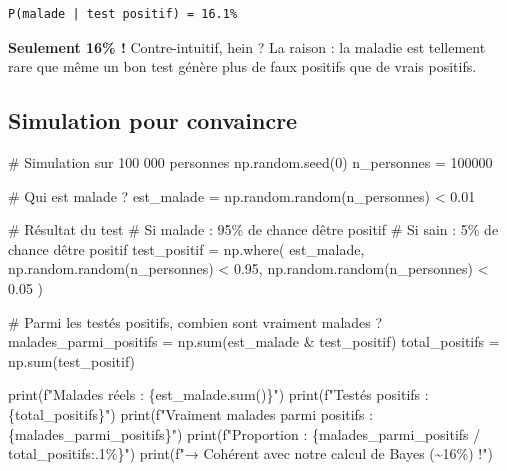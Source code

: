 \documentclass[
  french,
  11pt,
  a4paper,
]{scrbook}
\newenvironment{Shaded}{}{}
\newcommand{\BuiltInTok}[1]{\textcolor[rgb]{0.84,0.23,0.29}{#1}}
\newcommand{\CommentTok}[1]{\textcolor[rgb]{0.42,0.45,0.49}{#1}}
\newcommand{\DecValTok}[1]{\textcolor[rgb]{0.00,0.36,0.77}{#1}}
\newcommand{\FloatTok}[1]{\textcolor[rgb]{0.00,0.36,0.77}{#1}}
\newcommand{\NormalTok}[1]{\textcolor[rgb]{0.14,0.16,0.18}{#1}}
\newcommand{\OperatorTok}[1]{\textcolor[rgb]{0.14,0.16,0.18}{#1}}
\newcommand{\SpecialCharTok}[1]{\textcolor[rgb]{0.00,0.36,0.77}{#1}}
\newcommand{\SpecialStringTok}[1]{\textcolor[rgb]{0.01,0.18,0.38}{#1}}
\begin{document}
\begin{verbatim}
P(malade | test positif) = 16.1%
\end{verbatim}

\textbf{Seulement 16\% !} Contre-intuitif, hein ? La raison : la maladie
est tellement rare que même un bon test génère plus de faux positifs que
de vrais positifs.

\subsection{Simulation pour
convaincre}\label{simulation-pour-convaincre}

\begin{Shaded}
\begin{Highlighting}[]
\CommentTok{\# Simulation sur 100 000 personnes}
\NormalTok{np.random.seed(}\DecValTok{0}\NormalTok{)}
\NormalTok{n\_personnes }\OperatorTok{=} \DecValTok{100000}

\CommentTok{\# Qui est malade ?}
\NormalTok{est\_malade }\OperatorTok{=}\NormalTok{ np.random.random(n\_personnes) }\OperatorTok{\textless{}} \FloatTok{0.01}

\CommentTok{\# Résultat du test}
\CommentTok{\# Si malade : 95\% de chance d\textquotesingle{}être positif}
\CommentTok{\# Si sain   : 5\% de chance d\textquotesingle{}être positif}
\NormalTok{test\_positif }\OperatorTok{=}\NormalTok{ np.where(}
\NormalTok{    est\_malade,}
\NormalTok{    np.random.random(n\_personnes) }\OperatorTok{\textless{}} \FloatTok{0.95}\NormalTok{,}
\NormalTok{    np.random.random(n\_personnes) }\OperatorTok{\textless{}} \FloatTok{0.05}
\NormalTok{)}

\CommentTok{\# Parmi les testés positifs, combien sont vraiment malades ?}
\NormalTok{malades\_parmi\_positifs }\OperatorTok{=}\NormalTok{ np.}\BuiltInTok{sum}\NormalTok{(est\_malade }\OperatorTok{\&}\NormalTok{ test\_positif)}
\NormalTok{total\_positifs }\OperatorTok{=}\NormalTok{ np.}\BuiltInTok{sum}\NormalTok{(test\_positif)}

\BuiltInTok{print}\NormalTok{(}\SpecialStringTok{f"Malades réels           : }\SpecialCharTok{\{}\NormalTok{est\_malade}\SpecialCharTok{.}\BuiltInTok{sum}\NormalTok{()}\SpecialCharTok{\}}\SpecialStringTok{"}\NormalTok{)}
\BuiltInTok{print}\NormalTok{(}\SpecialStringTok{f"Testés positifs         : }\SpecialCharTok{\{}\NormalTok{total\_positifs}\SpecialCharTok{\}}\SpecialStringTok{"}\NormalTok{)}
\BuiltInTok{print}\NormalTok{(}\SpecialStringTok{f"Vraiment malades parmi positifs : }\SpecialCharTok{\{}\NormalTok{malades\_parmi\_positifs}\SpecialCharTok{\}}\SpecialStringTok{"}\NormalTok{)}
\BuiltInTok{print}\NormalTok{(}\SpecialStringTok{f"Proportion : }\SpecialCharTok{\{}\NormalTok{malades\_parmi\_positifs }\OperatorTok{/}\NormalTok{ total\_positifs}\SpecialCharTok{:.1\%\}}\SpecialStringTok{"}\NormalTok{)}
\BuiltInTok{print}\NormalTok{(}\SpecialStringTok{f"→ Cohérent avec notre calcul de Bayes (\textasciitilde{}16\%) !"}\NormalTok{)}
\end{Highlighting}
\end{Shaded}
\end{document}
